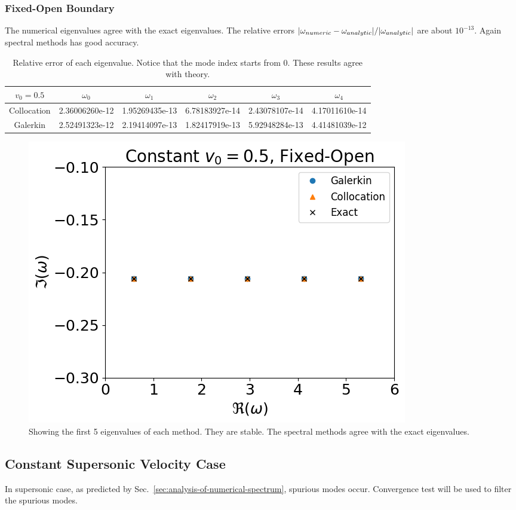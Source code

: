 \subsubsection*{Fixed-Open Boundary}
The numerical eigenvalues agree with the exact eigenvalues. The relative errors $\abs{\omega_{numeric} -\omega_{analytic}}/\abs{\omega_{analytic}}$ are about $10^{-13}$. Again spectral methods has good accuracy.
\begin{table} [H]
	\centering
	\caption{Relative error of each eigenvalue. Notice that the mode index starts from 0. These results agree with theory.}
	\begin{tabular}{|c|c|c|c|c|c|}
		\hline
		$v_0=0.5$   & $\omega_0$     & $\omega_1$     & $\omega_2$     & $\omega_3$     & $\omega_4$     \\
		\hline
		Collocation & 2.36006260e-12 & 1.95269435e-13 & 6.78183927e-14 & 2.43078107e-14 & 4.17011610e-14 \\
		\hline
		Galerkin    & 2.52491323e-12 & 2.19414097e-13 & 1.82417919e-13 & 5.92948284e-13 & 4.41481039e-12 \\
		\hline
	\end{tabular}
	\label{table:eigenvalue-error-fixed-open-subsonic}
\end{table}

\begin{figure}[H]
	\centering
	\includegraphics[width=0.7\linewidth]{figures/constant-subsonic-fixed-open.png}
	\caption{Showing the first 5 eigenvalues of each method. They are stable. The spectral methods agree with the exact eigenvalues.}
	\label{fig:constant-subsoniv-fixed-open}
\end{figure}

\subsection{Constant Supersonic Velocity Case}
In supersonic case, as predicted by Sec.~\ref{sec:analysis-of-numerical-spectrum}, spurious modes occur. Convergence test will be used to filter the spurious modes.

